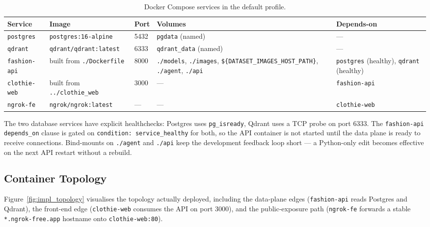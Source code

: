 \begin{table}[H]
\centering
\caption{Docker Compose services in the default profile.}
\label{tab:impl_services}
\small
\begin{tabular}{p{2.4cm} p{3.6cm} p{1.6cm} p{3.4cm} p{2.6cm}}
\toprule
\textbf{Service} & \textbf{Image} & \textbf{Port} & \textbf{Volumes} & \textbf{Depends-on} \\
\midrule
\texttt{postgres} & \texttt{postgres:16-alpine} & 5432 & \texttt{pgdata} (named) & --- \\
\texttt{qdrant} & \texttt{qdrant/qdrant:latest} & 6333 & \texttt{qdrant\_data} (named) & --- \\
\texttt{fashion-api} & built from \texttt{./Dockerfile} & 8000 & \texttt{./models}, \texttt{./images}, \texttt{\$\{DATASET\_IMAGES\_HOST\_PATH\}}, \texttt{./agent}, \texttt{./api} & \texttt{postgres} (healthy), \texttt{qdrant} (healthy) \\
\texttt{clothie-web} & built from \texttt{../clothie\_web} & 3000 & --- & \texttt{fashion-api} \\
\texttt{ngrok-fe} & \texttt{ngrok/ngrok:latest} & --- & --- & \texttt{clothie-web} \\
\bottomrule
\end{tabular}
\end{table}

The two database services have explicit healthchecks: Postgres uses \texttt{pg\_isready}, Qdrant uses a TCP probe on port 6333. The \texttt{fashion-api} \texttt{depends\_on} clause is gated on \texttt{condition: service\_healthy} for both, so the API container is not started until the data plane is ready to receive connections. Bind-mounts on \texttt{./agent} and \texttt{./api} keep the development feedback loop short --- a Python-only edit becomes effective on the next API restart without a rebuild.

\subsection{Container Topology}

Figure~\ref{fig:impl_topology} visualises the topology actually deployed, including the data-plane edges (\texttt{fashion-api} reads Postgres and Qdrant), the front-end edge (\texttt{clothie-web} consumes the API on port 3000), and the public-exposure path (\texttt{ngrok-fe} forwards a stable \texttt{*.ngrok-free.app} hostname onto \texttt{clothie-web:80}).

